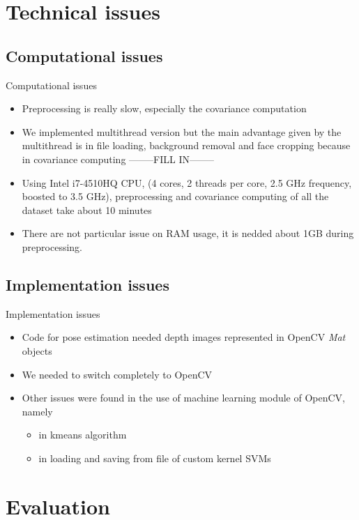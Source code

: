 \documentclass{beamer}
\begin{document}
\section{Technical issues}
\subsection{Computational issues}
\begin{frame}{Computational issues}
	\begin{itemize}
		\item Preprocessing is really slow, especially the covariance
			computation
		\item We implemented multithread version but the main advantage
			given by the multithread is in file loading, background
			removal and face cropping because in covariance
			computing --------FILL IN--------
		\item Using Intel i7-4510HQ CPU, (4 cores, 2 threads per core,
			2.5 GHz frequency, boosted to 3.5 GHz), preprocessing
			and covariance computing of all the dataset take about
			10 minutes
		\item There are not particular issue on RAM usage, it is nedded
			about 1GB during preprocessing.
	\end{itemize}
\end{frame}

\subsection{Implementation issues}
\begin{frame}{Implementation issues}
	\begin{itemize}
		\item Code for pose estimation needed depth images represented
			in OpenCV \textit{Mat} objects
		\item We needed to switch completely to OpenCV
		\item Other issues were found in the use of machine learning
			module of OpenCV, namely
			\begin{itemize}
				\item in kmeans algorithm
				\item in loading and saving from file of custom
					kernel SVMs
			\end{itemize}
	\end{itemize}
\end{frame}

\section{Evaluation}
\end{document}
